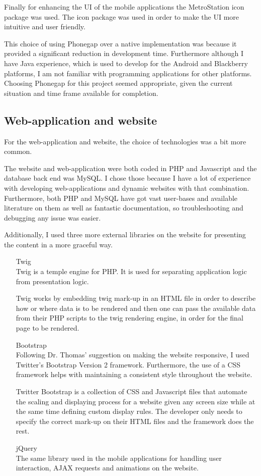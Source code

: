 \documentclass[12pt]{ecsproject}     %
\begin{document}
Finally for enhancing the UI of the mobile applications the MetroStation icon package was used. The icon package was used in order to make the UI more intuitive and user friendly.

This choice of using Phonegap over a native implementation was because it provided a significant reduction in development time. Furthermore although I have Java experience, which is used to develop for the Android and Blackberry platforms, I am not familiar with programming applications for other platforms. Choosing Phonegap for this project seemed appropriate, given the current situation and time frame available for completion.

\subsection{Web-application and website}
For the web-application and website, the choice of technologies was a bit more common. 

The website and web-application were both coded in PHP and Javascript and the database back end was MySQL. I chose those because I have a lot of experience with developing web-applications and dynamic websites with that combination. Furthermore, both PHP and MySQL have got vast user-bases and available literature on them as well as fantastic documentation, so troubleshooting and debugging any issue was easier.

Additionally, I used three more external libraries on the website for presenting the content in a more graceful way.

\begin{itemize}
\item[Twig]\hfill \\
Twig is a temple engine for PHP. It is used for separating application logic from presentation logic.

Twig works by embedding twig mark-up in an HTML file in order to describe how or where data is to be rendered and then one can pass the available data from their PHP scripts to the twig rendering engine, in order for the final page to be rendered.

\item[Bootstrap]\hfill \\
Following Dr. Thomas' suggestion on making the website responsive, I used Twitter's Bootstrap Version 2 framework. Furthermore, the use of a CSS framework helps with maintaining a consistent style throughout the website.

Twitter Bootstrap is a collection of CSS and Javascript files that automate the scaling and displaying process for a website given any screen size while at the same time defining custom display rules. The developer only needs to specify the correct mark-up on their HTML files and the framework does the rest.

\item[jQuery] \hfill \\
The same library used in the mobile applications for handling user interaction, AJAX requests and animations on the website.
\end{itemize}
\end{document}
